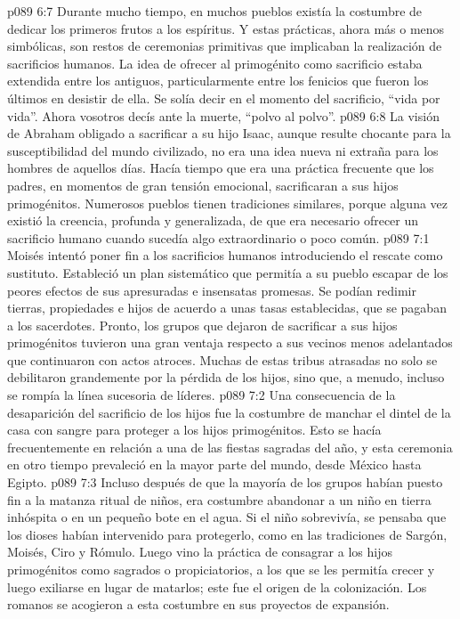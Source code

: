 \vs p089 6:7 \pc Durante mucho tiempo, en muchos pueblos existía la costumbre de dedicar los primeros frutos a los espíritus. Y estas prácticas, ahora más o menos simbólicas, son restos de ceremonias primitivas que implicaban la realización de sacrificios humanos. La idea de ofrecer al primogénito como sacrificio estaba extendida entre los antiguos, particularmente entre los fenicios que fueron los últimos en desistir de ella. Se solía decir en el momento del sacrificio, “vida por vida”. Ahora vosotros decís ante la muerte, “polvo al polvo”.
\vs p089 6:8 La visión de Abraham obligado a sacrificar a su hijo Isaac, aunque resulte chocante para la susceptibilidad del mundo civilizado, no era una idea nueva ni extraña para los hombres de aquellos días. Hacía tiempo que era una práctica frecuente que los padres, en momentos de gran tensión emocional, sacrificaran a sus hijos primogénitos. Numerosos pueblos tienen tradiciones similares, porque alguna vez existió la creencia, profunda y generalizada, de que era necesario ofrecer un sacrificio humano cuando sucedía algo extraordinario o poco común.
\vs p089 7:1 Moisés intentó poner fin a los sacrificios humanos introduciendo el rescate como sustituto. Estableció un plan sistemático que permitía a su pueblo escapar de los peores efectos de sus apresuradas e insensatas promesas. Se podían redimir tierras, propiedades e hijos de acuerdo a unas tasas establecidas, que se pagaban a los sacerdotes. Pronto, los grupos que dejaron de sacrificar a sus hijos primogénitos tuvieron una gran ventaja respecto a sus vecinos menos adelantados que continuaron con actos atroces. Muchas de estas tribus atrasadas no solo se debilitaron grandemente por la pérdida de los hijos, sino que, a menudo, incluso se rompía la línea sucesoria de líderes.
\vs p089 7:2 Una consecuencia de la desaparición del sacrificio de los hijos fue la costumbre de manchar el dintel de la casa con sangre para proteger a los hijos primogénitos. Esto se hacía frecuentemente en relación a una de las fiestas sagradas del año, y esta ceremonia en otro tiempo prevaleció en la mayor parte del mundo, desde México hasta Egipto.
\vs p089 7:3 Incluso después de que la mayoría de los grupos habían puesto fin a la matanza ritual de niños, era costumbre abandonar a un niño en tierra inhóspita o en un pequeño bote en el agua. Si el niño sobrevivía, se pensaba que los dioses habían intervenido para protegerlo, como en las tradiciones de Sargón, Moisés, Ciro y Rómulo. Luego vino la práctica de consagrar a los hijos primogénitos como sagrados o propiciatorios, a los que se les permitía crecer y luego exiliarse en lugar de matarlos; este fue el origen de la colonización. Los romanos se acogieron a esta costumbre en sus proyectos de expansión.
